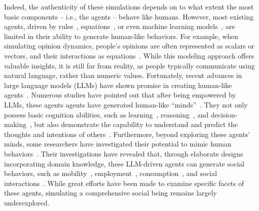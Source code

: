 Indeed, the authenticity of these simulations depends on to what extent the most basic components -- i.e., the agents -- behave like humans. However, most existing agents, driven by rules~\cite{epstein1996growing}, equations~\cite{helbing1995social}, or even machine learning models~\cite{zheng2022ai}, are limited in their ability to generate human-like behaviors. For example, when simulating opinion dynamics, people's opinions are often represented as scalars or vectors, and their interactions as equations~\cite{baumann2021emergence}. While this modeling approach offers valuable insights, it is still far from reality, as people typically communicate using natural language, rather than numeric values. Fortunately, recent advances in large language models (LLMs) have shown promise in creating human-like agents~\cite{gao2024large,wang2024survey,xi2023rise}. Numerous studies have pointed out that after being empowered by LLMs, these agents agents have generated human-like ``minds''~\cite{strachan2024testing,li2023camel,kosinski2024evaluating}. They not only possess basic cognition abilities, such as learning~\cite{xi2023rise,wang2024survey}, reasoning~\cite{wei2022chain}, and decision-making~\cite{li2024econagent,gao2024large}, but also demonstrate the capability to understand and predict the thoughts and intentions of others~\cite{kosinski2024evaluating,strachan2024testing}. Furthermore, beyond exploring these agents' minds, some researchers have investigated their potential to mimic human behaviors~\cite{li2024econagent,piao2025emergence,shao2024beyond,yan2024opencity,feng2024agentmove,horton2023large,gao2023s,park2023generative}. Their investigations have revealed that, through elaborate designs incorporating domain knowledge, these LLM-driven agents can generate social behaviors, such as mobility~\cite{shao2024beyond,yan2024opencity,feng2024agentmove}, employment~\cite{li2024econagent,horton2023large}, consumption~\cite{li2024econagent,horton2023large}, and social interactions~\cite{gao2023s,park2023generative}. While great efforts have been made to examine specific facets of these agents, simulating a comprehensive social being remains largely underexplored.


